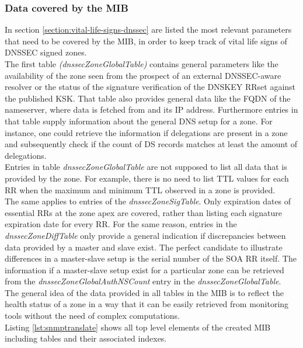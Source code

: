 \subsubsection{Data covered by the MIB}
In section \ref{section:vital-life-signs-dnssec} are listed the most relevant parameters that need to be covered by the MIB, in order to keep track of vital life signs of DNSSEC signed zones. 
\\
The first table \textit{(dnssecZoneGlobalTable)} contains general parameters like the availability of the zone seen from the prospect of an external DNSSEC-aware resolver or the status of the signature verification of the DNSKEY RRset against the published KSK. That table also provides general data like the FQDN of the nameserver, where data is fetched from and its IP address. Furthermore entries in that table supply information about the general DNS setup for a zone. For instance, one could retrieve the information if delegations are present in a zone and subsequently check if the count of DS records matches at least the amount of delegations. 
\\
Entries in table \textit{dnssecZoneGlobalTable} are not supposed to list all data that is provided by the zone. For example, there is no need to list TTL values for each RR when the maximum and minimum TTL observed in a zone is provided. 
\\
The same applies to entries of the \textit{dnssecZoneSigTable}. Only expiration dates of essential RRs at the zone apex are covered, rather than listing each signature expiration date for every RR. For the same reason, entries in the \textit{dnssecZoneDiffTable} only provide a general indication if discrepancies between data provided by a master and slave exist. The perfect candidate to illustrate differences in a master-slave setup is the serial number of the SOA RR itself. The information if a master-slave setup exist for a particular zone can be retrieved from the \textit{dnssecZoneGlobalAuthNSCount} entry in the \textit{ dnssecZoneGlobalTable}.
\\
The general idea of the data provided in all tables in the MIB is to reflect the health status of a zone in a way that it can be easily retrieved from monitoring tools without the need of complex computations.
\\
Listing \ref{lst:snmptranslate} shows all top level elements of the created MIB including tables and their associated indexes.


